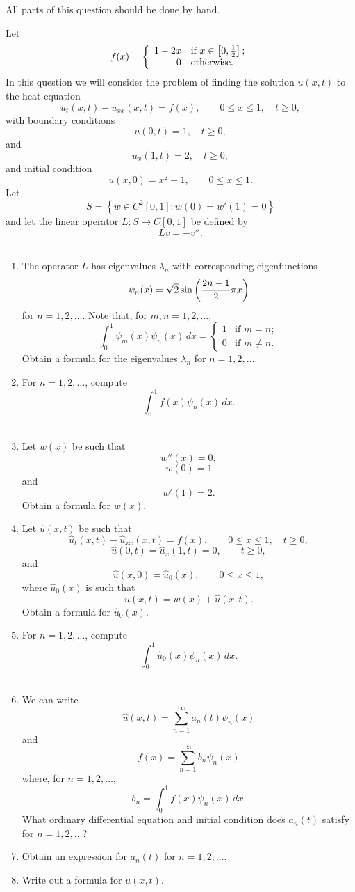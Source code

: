 
All parts of this question should be done by hand.

Let
\[
f(x)=\left\{\begin{array}{rl}1-2x&\mbox{if }x\in\left[0,{1\over2}\right];\\0&\mbox{otherwise}.\end{array}\right.
\]
In this question we will consider the problem of finding the solution $u(x,t)$ to the heat equation
\[ 
u_t(x,t)-u_{xx}(x,t) = f(x), \qquad 0\le x \le 1, \quad t\ge 0,
\]
with boundary conditions
\[
u(0,t)=1, \quad t\ge 0,
\]
and
\[
u_x(1,t)=2, \quad t\ge 0,
\]
and initial condition
\[
u(x,0) = x^2+1, \qquad 0\le x\le 1.
\]
Let
\[
S = \left\{ w \in C^2[0,1] : w(0) = w'(1) = 0 \right\}
\]
and let the linear operator $L: S\to C[0,1]$ be defined by
\[
L v = -v''.
\]
\\
\begin{enumerate}
\item The operator $L$ has eigenvalues $\lambda_n$ with corresponding eigenfunctions
\[
\psi_n(x) = \sqrt{2} \sin\left({2n-1\over 2}\pi x\right)
\]
for $n=1,2,\ldots$. Note that, for $m,n=1,2,\ldots$,
\[
\int_0^1\psi_m(x)\psi_n(x)\,dx=\left\{\begin{array}{rl}1&\mbox{if }m=n;\\0&\mbox{if }m\ne n.\end{array}\right.
\]
Obtain a formula for the eigenvalues $\lambda_n$ for $n=1,2,\ldots$.
\\
\item For $n=1,2,\ldots$, compute
\[
\int_0^1f(x)\psi_n(x)\,dx.
\]
\\
\item Let $w(x)$ be such that
\[
w''(x)=0,
\]
\[
w(0)=1
\]
and
\[
w'(1)=2.
\]
Obtain a formula for $w(x)$.
\\
\item Let $\hat{u}(x,t)$ be such that
\[ 
\hat{u}_t(x,t)-\hat{u}_{xx}(x,t) = f(x), \qquad 0\le x \le 1, \quad t\ge 0,
\]
\[
\hat{u}(0,t)=\hat{u}_x(1,t)=0, \qquad t\ge 0,
\]
and
\[
\hat{u}(x,0) = \hat{u}_0(x), \qquad 0\le x\le 1,
\]
where $\hat{u}_0(x)$ is such that
\[
u(x,t) = w(x)+\hat{u}(x,t).
\]
Obtain a formula for $\hat{u}_0(x)$.
\\
\item For $n=1,2,\ldots$, compute
\[
\int_0^1\hat{u}_0(x)\psi_n(x)\,dx.
\]
\\
\item We can write
\[
\hat{u}(x,t) = \sum_{n=1}^\infty a_n(t) \psi_n(x)
\]
and
\[
f(x) = \sum_{n=1}^\infty b_n\psi_n(x)
\]
where, for $n = 1,2,\ldots$,
\[
b_n = \int_0^1f(x) \psi_n(x)\,dx.
\]
What ordinary differential equation and initial condition does $a_n(t)$ satisfy for $n = 1,2,\ldots$?
\\
\item Obtain an expression for $a_n(t)$ for $n=1,2,\ldots$.
\\
\item Write out a formula for $u(x,t)$.
\end{enumerate}




